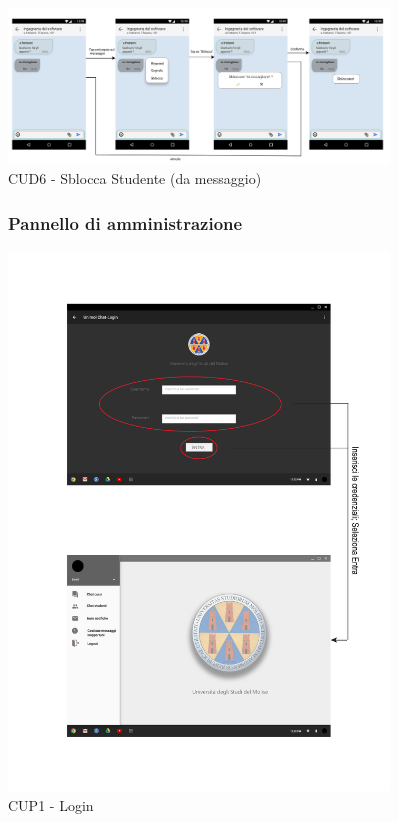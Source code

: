 \begin{figure}
	\centering
	\includegraphics[width=0.9\textwidth]{imgs/gruppo6/activities/act_cud6_sblocca_da_messaggio.pdf}
	\caption{CUD6 - Sblocca Studente (da messaggio)}
	\label{fig:act-cud6-2}
\end{figure}

\pagebreak
\begin{figure}[!h]
	\subsubsection{Pannello di amministrazione}
	\centering
	\includegraphics[width=0.9\textwidth]{imgs/gruppo6/activities/act_cup1_login.pdf}
	\caption{CUP1 - Login}
	\label{fig:act-cup1}
\end{figure}

